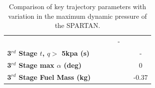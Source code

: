 \begin{table}[ht!]
\begin{tabular}{l c c c c c c}
		& \textbf{\thirddExergyEffqStandardNoReturn}
		& \textbf{\thirddExergyEffqFiftyFiveNoReturn}
		& \textbf{\thirddExergyEffqSixtyNoReturn}
		& -
		\\
		\textbf{3$^{rd}$ Stage $t$, $q >$ 5kpa (s)}
		& \thirdqOverFiveqFortyNoReturn
		& \thirdqOverFiveqFortyFiveNoReturn
		& \thirdqOverFiveqStandardNoReturn
		& \thirdqOverFiveqFiftyFiveNoReturn
		& \thirdqOverFiveqSixtyNoReturn
		& -
		\\
		\textbf{3$^{rd}$ Stage max $\alpha$ (deg)}
		& \thirdmaxAoAqFortyNoReturn
		& \thirdmaxAoAqFortyFiveNoReturn
		& \thirdmaxAoAqStandardNoReturn
		& \thirdmaxAoAqFiftyFiveNoReturn
		& \thirdmaxAoAqSixtyNoReturn
		&0
		\\
		\textbf{3$^{rd}$ Stage Fuel Mass (kg)}
		& \thirdmFuelqFortyNoReturn
		& \thirdmFuelqFortyFiveNoReturn
		& \thirdmFuelqStandardNoReturn
		& \thirdmFuelqFiftyFiveNoReturn
		& \thirdmFuelqSixtyNoReturn
		&-0.37
		\\
		\hline 
	\end{tabular} 
	\caption{Comparison of key trajectory parameters with variation in the maximum dynamic pressure of the SPARTAN.}
	\label{tab:qvarnoreturn}
\end{table}





